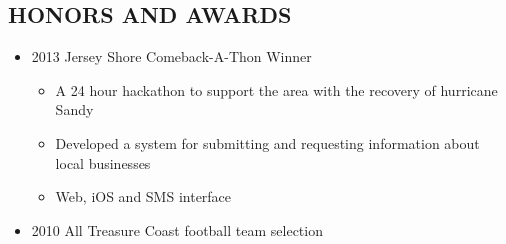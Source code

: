 \documentclass{res}
\begin{document}
\begin{resume}
\section{HONORS AND AWARDS}
    \begin{itemize}
        \item 2013 Jersey Shore Comeback-A-Thon Winner
            \begin{itemize}
                \item A 24 hour hackathon to support the area with the recovery of hurricane Sandy
                \item Developed a system for submitting and requesting information about local businesses
                \item Web, iOS and SMS interface
            \end{itemize}
        \item 2010 All Treasure Coast football team selection
    \end{itemize}


\end{resume}
\end{document}
